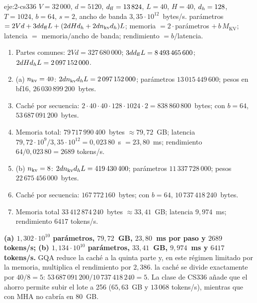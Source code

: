 \begin{solucion}{eje:2-cs336}
\datos $V=32\,000$, $d=5120$, $d_{\mathrm{ff}}=13\,824$, $L=40$, $H=40$, $d_{h}=128$, $T=1024$, $b=64$, $s=2$, ancho de banda $3{,}35\cdot 10^{12}$~bytes/s.
\planteamiento parámetros $=2Vd+3dd_{\mathrm{ff}} L+(2dHd_{h}+2dn_{\mathrm{kv}}d_{h})L$; memoria $=2\cdot$parámetros $+\,b\,M_{\mathrm{KV}}$; latencia $=$ memoria$/$ancho de banda; rendimiento $=b/$latencia.
\pasos
\begin{enumerate}[label=\arabic*.]
  \item Partes comunes: $2Vd=327\,680\,000$; $3dd_{\mathrm{ff}} L=8\,493\,465\,600$; $2dHd_{h} L=2\,097\,152\,000$.
  \item (a) $n_{\mathrm{kv}}=40$: $2dn_{\mathrm{kv}}d_{h} L=2\,097\,152\,000$; parámetros $13\,015\,449\,600$; pesos en bf16, $26\,030\,899\,200$~bytes.
  \item Caché por secuencia: $2\cdot 40\cdot 40\cdot 128\cdot 1024\cdot 2=838\,860\,800$~bytes; con $b=64$, $53\,687\,091\,200$~bytes.
  \item Memoria total: $79\,717\,990\,400$~bytes $\approx 79{,}72$~GB; latencia $79{,}72\cdot 10^{9}/3{,}35\cdot 10^{12}=0{,}023\,80$~s $=23{,}80$~ms; rendimiento $64/0{,}023\,80=2689$ tokens/s.
  \item (b) $n_{\mathrm{kv}}=8$: $2dn_{\mathrm{kv}}d_{h} L=419\,430\,400$; parámetros $11\,337\,728\,000$; pesos $22\,675\,456\,000$~bytes.
  \item Caché por secuencia: $167\,772\,160$~bytes; con $b=64$, $10\,737\,418\,240$~bytes.
  \item Memoria total $33\,412\,874\,240$~bytes $\approx 33{,}41$~GB; latencia $9{,}974$~ms; rendimiento $6417$ tokens/s.
\end{enumerate}
\resultado \textbf{(a) $1{,}302\cdot 10^{10}$ parámetros, $79{,}72$~GB, $23{,}80$~ms por paso y $2689$ tokens/s; (b) $1{,}134\cdot 10^{10}$ parámetros, $33{,}41$~GB, $9{,}974$~ms y $6417$ tokens/s.} GQA reduce la caché a la quinta parte y, en este régimen limitado por la memoria, multiplica el rendimiento por $2{,}386$.
\comprobacion la caché se divide exactamente por $40/8=5$: $53\,687\,091\,200/10\,737\,418\,240=5$. La clase de CS336 añade que el ahorro permite subir el lote a 256 ($65{,}63$~GB y $13\,068$ tokens/s), mientras que con MHA no cabría en 80~GB.
\end{solucion}

